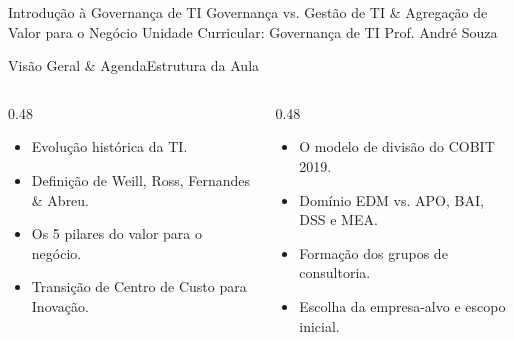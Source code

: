 
\senaicover
  {Introdução à Governança de TI}
  {Governança vs. Gestão de TI \& Agregação de Valor para o Negócio}
  {Unidade Curricular: Governança de TI}
  {Prof. André Souza}

\begin{senaiframe}{Visão Geral \& Agenda}{Estrutura da Aula}
  \begin{columns}[t]
    \begin{column}{0.48\textwidth}
      \begin{tcolorbox}[senaibluecard, title={1. Conceitos de Governança}]
        \begin{itemize}
          \item Evolução histórica da TI.
          \item Definição de Weill, Ross, Fernandes \& Abreu.
        \end{itemize}
      \end{tcolorbox}
      \vspace{4pt}
      \begin{tcolorbox}[senaiambercard, title={3. Agregação de Valor}]
        \begin{itemize}
          \item Os 5 pilares do valor para o negócio.
          \item Transição de Centro de Custo para Inovação.
        \end{itemize}
      \end{tcolorbox}
    \end{column}
    \begin{column}{0.48\textwidth}
      \begin{tcolorbox}[senairedcard, title={2. Governança vs. Gestão}]
        \begin{itemize}
          \item O modelo de divisão do COBIT 2019.
          \item Domínio EDM vs. APO, BAI, DSS e MEA.
        \end{itemize}
      \end{tcolorbox}
      \vspace{4pt}
      \begin{tcolorbox}[senaigreencard, title={4. Oficina do PDGTI}]
        \begin{itemize}
          \item Formação dos grupos de consultoria.
          \item Escolha da empresa-alvo e escopo inicial.
        \end{itemize}
      \end{tcolorbox}
    \end{column}
  \end{columns}
\end{senaiframe}

